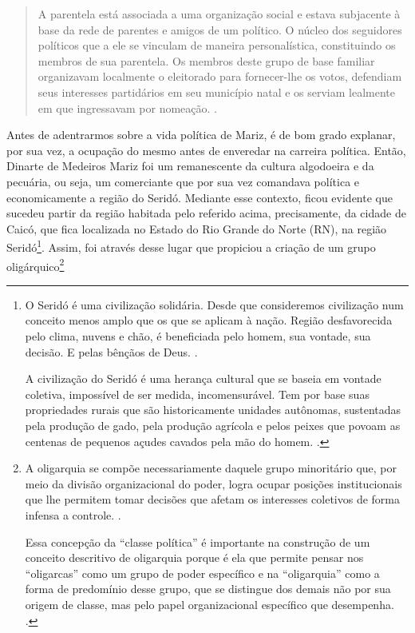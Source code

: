 \begin{refsection}
    \begin{quotation}
        A parentela está associada a uma organização social e estava subjacente à base da rede de parentes e amigos de um político. O núcleo dos seguidores políticos que a ele se vinculam de maneira personalística, constituindo os membros de sua parentela. Os membros deste grupo de base familiar organizavam localmente o eleitorado para fornecer-lhe os votos, defendiam seus interesses partidários em seu município natal e os serviam lealmente em que ingressavam por nomeação. \cite[p.~113]{Lewin1993Politica}.
    \end{quotation}

    Antes de adentrarmos sobre a vida política de Mariz, é de bom grado explanar, por sua vez, a ocupação do mesmo antes de enveredar na carreira política. Então, Dinarte de Medeiros Mariz foi um remanescente da cultura algodoeira e da pecuária, ou seja, um comerciante que por sua vez comandava política e economicamente a região do Seridó. Mediante esse contexto, ficou evidente que sucedeu partir da região habitada pelo referido acima, precisamente, da cidade de Caicó, que fica localizada no Estado do Rio Grande do Norte (RN), na região Seridó\footnote{O Seridó é uma civilização solidária. Desde que consideremos civilização num conceito menos amplo que os que se aplicam à nação. Região desfavorecida pelo clima, nuvens e chão, é beneficiada pelo homem, sua vontade, sua decisão. E pelas bênçãos de Deus. \cite[p.~57]{Lima2003Solidao}.

    A civilização do Seridó é uma herança cultural que se baseia em vontade coletiva, impossível de ser medida, incomensurável. Tem por base suas propriedades rurais que são historicamente unidades autônomas, sustentadas pela produção de gado, pela produção agrícola e pelos peixes que povoam as centenas de pequenos açudes cavados pela mão do homem. \cite[p.~57--58]{Lima2003Solidao}. }. Assim, foi através desse lugar que propiciou a criação de um grupo oligárquico\footnote{A oligarquia se compõe necessariamente daquele grupo minoritário que, por meio da divisão organizacional do poder, logra ocupar posições institucionais que lhe permitem tomar decisões que afetam os interesses coletivos de forma infensa a controle. \cite[p.~48]{Couto2012Oligarquias}.

    Essa concepção da ``classe política'' é importante na construção de um conceito descritivo de oligarquia porque é ela que permite pensar nos ``oligarcas'' como um grupo de poder específico e na ``oligarquia'' como a forma de predomínio desse grupo, que se distingue dos demais não por sua origem de classe, mas pelo papel organizacional específico que desempenha. \cite[p.~48]{Couto2012Oligarquias}.
    
}
\end{refsection}
